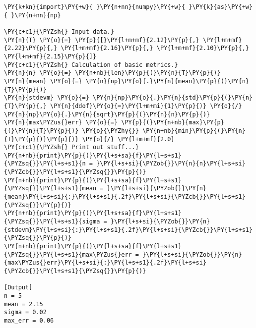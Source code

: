 \begin{Verbatim}[label=\makebox{\href{https://github.com/unipi-physics-labs/lab1-notes/tree/main/snippy/mean_stdev.py}{https://github.com/.../mean\_stdev.py}},commandchars=\\\{\}]
\PY{k+kn}{import}\PY{+w}{ }\PY{n+nn}{numpy}\PY{+w}{ }\PY{k}{as}\PY{+w}{ }\PY{n+nn}{np}

\PY{c+c1}{\PYZsh{} Input data.}
\PY{n}{T} \PY{o}{=} \PY{p}{[}\PY{l+m+mf}{2.12}\PY{p}{,} \PY{l+m+mf}{2.22}\PY{p}{,} \PY{l+m+mf}{2.16}\PY{p}{,} \PY{l+m+mf}{2.10}\PY{p}{,} \PY{l+m+mf}{2.15}\PY{p}{]}
\PY{c+c1}{\PYZsh{} Calculation of basic metrics.}
\PY{n}{n} \PY{o}{=} \PY{n+nb}{len}\PY{p}{(}\PY{n}{T}\PY{p}{)}
\PY{n}{mean} \PY{o}{=} \PY{n}{np}\PY{o}{.}\PY{n}{mean}\PY{p}{(}\PY{n}{T}\PY{p}{)}
\PY{n}{stdevm} \PY{o}{=} \PY{n}{np}\PY{o}{.}\PY{n}{std}\PY{p}{(}\PY{n}{T}\PY{p}{,} \PY{n}{ddof}\PY{o}{=}\PY{l+m+mi}{1}\PY{p}{)} \PY{o}{/} \PY{n}{np}\PY{o}{.}\PY{n}{sqrt}\PY{p}{(}\PY{n}{n}\PY{p}{)}
\PY{n}{max\PYZus{}err} \PY{o}{=} \PY{p}{(}\PY{n+nb}{max}\PY{p}{(}\PY{n}{T}\PY{p}{)} \PY{o}{\PYZhy{}} \PY{n+nb}{min}\PY{p}{(}\PY{n}{T}\PY{p}{)}\PY{p}{)} \PY{o}{/} \PY{l+m+mf}{2.0}
\PY{c+c1}{\PYZsh{} Print out stuff...}
\PY{n+nb}{print}\PY{p}{(}\PY{l+s+sa}{f}\PY{l+s+s1}{\PYZsq{}}\PY{l+s+s1}{n = }\PY{l+s+si}{\PYZob{}}\PY{n}{n}\PY{l+s+si}{\PYZcb{}}\PY{l+s+s1}{\PYZsq{}}\PY{p}{)}
\PY{n+nb}{print}\PY{p}{(}\PY{l+s+sa}{f}\PY{l+s+s1}{\PYZsq{}}\PY{l+s+s1}{mean = }\PY{l+s+si}{\PYZob{}}\PY{n}{mean}\PY{l+s+si}{:}\PY{l+s+s1}{.2f}\PY{l+s+si}{\PYZcb{}}\PY{l+s+s1}{\PYZsq{}}\PY{p}{)}
\PY{n+nb}{print}\PY{p}{(}\PY{l+s+sa}{f}\PY{l+s+s1}{\PYZsq{}}\PY{l+s+s1}{sigma = }\PY{l+s+si}{\PYZob{}}\PY{n}{stdevm}\PY{l+s+si}{:}\PY{l+s+s1}{.2f}\PY{l+s+si}{\PYZcb{}}\PY{l+s+s1}{\PYZsq{}}\PY{p}{)}
\PY{n+nb}{print}\PY{p}{(}\PY{l+s+sa}{f}\PY{l+s+s1}{\PYZsq{}}\PY{l+s+s1}{max\PYZus{}err = }\PY{l+s+si}{\PYZob{}}\PY{n}{max\PYZus{}err}\PY{l+s+si}{:}\PY{l+s+s1}{.2f}\PY{l+s+si}{\PYZcb{}}\PY{l+s+s1}{\PYZsq{}}\PY{p}{)}

[Output]
n = 5
mean = 2.15
sigma = 0.02
max_err = 0.06
\end{Verbatim}
